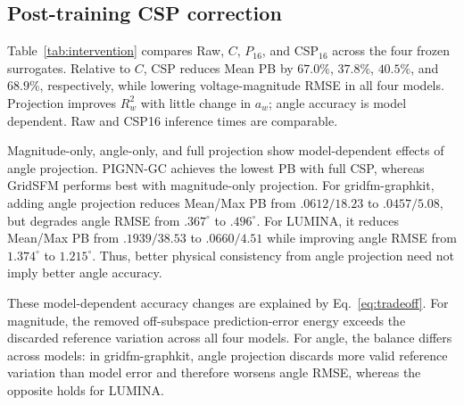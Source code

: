 \documentclass{article}
\begin{document}

\subsection{Post-training CSP correction}

Table~\ref{tab:intervention} compares Raw, $C$, $P_{16}$, and CSP$_{16}$ across the four frozen surrogates. Relative to $C$, CSP reduces Mean
PB by $67.0\%$, $37.8\%$, $40.5\%$, and $68.9\%$, respectively, while
lowering voltage-magnitude RMSE in all four models.
Projection improves $R_w^2$ with little change in $a_w$; angle
accuracy is model dependent. Raw and CSP16 inference times are
comparable.

Magnitude-only, angle-only, and full projection show model-dependent effects of
angle projection. PIGNN-GC achieves the lowest PB with full CSP, whereas
GridSFM performs best with magnitude-only projection. For gridfm-graphkit,
adding angle projection reduces Mean/Max PB from $.0612/18.23$ to $.0457/5.08$,
but degrades angle RMSE from $.367^\circ$ to $.496^\circ$. For LUMINA, it
reduces Mean/Max PB from $.1939/38.53$ to $.0660/4.51$ while improving angle RMSE
from $1.374^\circ$ to $1.215^\circ$. Thus, better physical consistency from
angle projection need not imply better angle accuracy.


These model-dependent accuracy changes are explained by
Eq.~\eqref{eq:tradeoff}. For magnitude, the removed off-subspace
prediction-error energy exceeds the discarded reference variation
across all four models. For angle, the balance differs across models:
in gridfm-graphkit, angle projection discards more valid reference
variation than model error and therefore worsens angle RMSE, whereas
the opposite holds for LUMINA.
\end{document}
